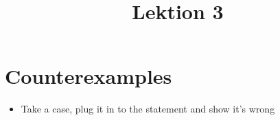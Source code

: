 \documentclass[danish,english,10pt,a4paper]{article}
\title{Lektion 3}
\begin{document}
\maketitle


\section*{Counterexamples}
\begin{theo}[Counterexample] 
\begin{itemize}
\item Take a case, plug it in to the statement and show it's wrong
\end{itemize}
\end{theo}
\end{document}
